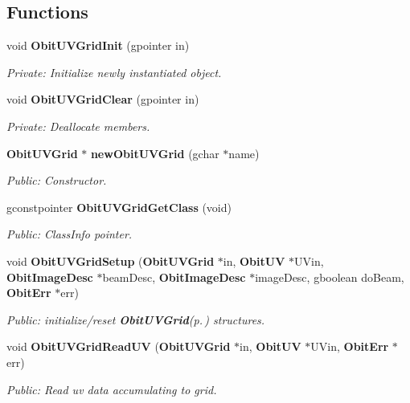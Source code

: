 \subsection*{Functions}
\begin{CompactItemize}
\item 
void {\bf Obit\-UVGrid\-Init} (gpointer in)
\begin{CompactList}\small\item\em Private: Initialize newly instantiated object. \item\end{CompactList}\item 
void {\bf Obit\-UVGrid\-Clear} (gpointer in)
\begin{CompactList}\small\item\em Private: Deallocate members. \item\end{CompactList}\item 
{\bf Obit\-UVGrid} $\ast$ {\bf new\-Obit\-UVGrid} (gchar $\ast$name)
\begin{CompactList}\small\item\em Public: Constructor. \item\end{CompactList}\item 
gconstpointer {\bf Obit\-UVGrid\-Get\-Class} (void)
\begin{CompactList}\small\item\em Public: Class\-Info pointer. \item\end{CompactList}\item 
void {\bf Obit\-UVGrid\-Setup} ({\bf Obit\-UVGrid} $\ast$in, {\bf Obit\-UV} $\ast$UVin, {\bf Obit\-Image\-Desc} $\ast$beam\-Desc, {\bf Obit\-Image\-Desc} $\ast$image\-Desc, gboolean do\-Beam, {\bf Obit\-Err} $\ast$err)
\begin{CompactList}\small\item\em Public: initialize/reset {\bf Obit\-UVGrid}{\rm (p.\,\pageref{structObitUVGrid})} structures. \item\end{CompactList}\item 
void {\bf Obit\-UVGrid\-Read\-UV} ({\bf Obit\-UVGrid} $\ast$in, {\bf Obit\-UV} $\ast$UVin, {\bf Obit\-Err} $\ast$err)
\begin{CompactList}\small\item\em Public: Read uv data accumulating to grid. \item\end{CompactList}\item 

\end{CompactItemize}
